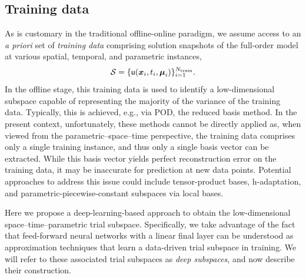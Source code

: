\documentclass[3p,computermodern,10pt]{elsarticle}
\begin{document}
\subsection{Training data}
As is customary in the traditional offline-online paradigm, we assume access to an \textit{a priori} set of \textit{training data} comprising solution snapshots of the full-order model at various spatial, temporal, and parametric instances,
$$\mathcal{S} = \{\mathsf{u}(\boldsymbol x_i,t_i,\boldsymbol \mu_i) \}_{i=1}^{N_{\text{train}}}.$$ 
In the offline stage, this training data is used to identify a low-dimensional subspace capable of representing the majority of the variance of the training data. Typically, this is achieved, e.g., via POD, the reduced basis method. 
In the present context, unfortunately, these methods cannot be directly applied as, when viewed from the parametric--space--time perspective, the training data comprises only a single training instance, and thus only a single basis vector can be extracted. While this basis vector yields perfect reconstruction error on the training data, it may be inaccurate for prediction at new data points. Potential approaches to address this issue could include tensor-product bases, h-adaptation, and parametric-piecewise-constant subspaces via local bases. 

Here we propose a deep-learning-based approach to obtain the low-dimensional space--time--parametric trial subspace. Specifically, we take advantage of the fact that feed-forward neural networks with a linear final layer can be understood as approximation techniques that learn a data-driven trial subspace in training. We will refer to these associated trial subspaces as \textit{deep subspaces}, and now describe their construction. 
\end{document}
